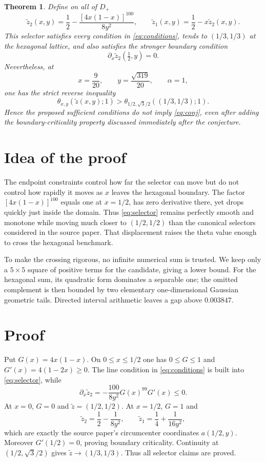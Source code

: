 \documentclass[11pt]{article}
\newtheorem{theorem}{Theorem}
\newcommand{\D}{D_+}
\newcommand{\tht}{\theta}
\begin{document}
\begin{theorem}\label{thm:main}
Define on all of $\D$
\begin{equation}\label{eq:selector}
 \widetilde z_2(x,y)=\frac12-\frac{[4x(1-x)]^{100}}{8y^2},
 \qquad
 \widetilde z_1(x,y)=\frac12-x\widetilde z_2(x,y).
\end{equation}
This selector satisfies every condition in \eqref{eq:conditions}, tends to
$(1/3,1/3)$ at the hexagonal lattice, and also satisfies the stronger boundary
condition
\[
 \partial_x\widetilde z_2(\tfrac12,y)=0.
\]
Nevertheless, at
\begin{equation}\label{eq:test}
 x=\frac9{20},\qquad y=\frac{\sqrt{319}}{20},\qquad \alpha=1,
\end{equation}
one has the strict reverse inequality
\[
 \tht_{x,y}(\widetilde z(x,y);1)
 >\tht_{1/2,\sqrt3/2}((1/3,1/3);1).
\]
Hence the proposed sufficient conditions do not imply \eqref{eq:conj}, even
after adding the boundary-criticality property discussed immediately after
the conjecture.
\end{theorem}

\section{Idea of the proof}

The endpoint constraints control how far the selector can move but do not
control how rapidly it moves as $x$ leaves the hexagonal boundary.  The factor
$[4x(1-x)]^{100}$ equals one at $x=1/2$, has zero derivative there, yet drops
quickly just inside the domain.  Thus \eqref{eq:selector} remains perfectly
smooth and monotone while moving much closer to $(1/2,1/2)$ than the canonical
selectors considered in the source paper.  That displacement raises the theta
value enough to cross the hexagonal benchmark.

To make the crossing rigorous, no infinite numerical sum is trusted.  We keep
only a $5\times5$ square of positive terms for the candidate, giving a lower
bound.  For the hexagonal sum, its quadratic form dominates a separable one;
the omitted complement is then bounded by two elementary one-dimensional
Gaussian geometric tails.  Directed interval arithmetic leaves a gap above
$0.003847$.

\section{Proof}

Put $G(x)=4x(1-x)$.  On $0\leq x\leq1/2$ one has $0\leq G\leq1$ and
$G'(x)=4(1-2x)\geq0$.  The line condition in \eqref{eq:conditions} is built
into \eqref{eq:selector}, while
\[
 \partial_x\widetilde z_2
 =-\frac{100}{8y^2}G(x)^{99}G'(x)\leq0.
\]
At $x=0$, $G=0$ and $\widetilde z=(1/2,1/2)$.  At $x=1/2$, $G=1$ and
\[
 \widetilde z_2=\frac12-\frac1{8y^2},\qquad
 \widetilde z_1=\frac14+\frac1{16y^2},
\]
which are exactly the source paper's circumcenter coordinates
$a(1/2,y)$.  Moreover $G'(1/2)=0$, proving boundary criticality.  Continuity
at $(1/2,\sqrt3/2)$ gives $\widetilde z\to(1/3,1/3)$.  Thus all selector
claims are proved.
\end{document}
